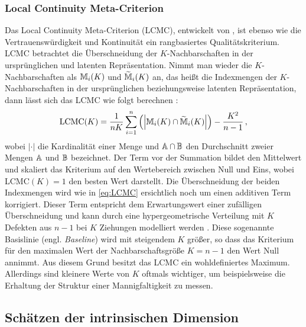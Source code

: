 \subsubsection{Local Continuity Meta-Criterion}
\label{ch:Vergleich:sec:Methodik:subsec:Qualitaetskriterien:LCMC}
Das Local Continuity Meta-Criterion (LCMC), entwickelt von \textcite{Chen.2009}, ist ebenso wie die Vertrauenswürdigkeit und Kontinuität ein rangbasiertes Qualitätskriterium. LCMC betrachtet die Überschneidung der $K$-Nachbarschaften in der ursprünglichen und latenten Repräsentation. Nimmt man wieder die $K$-Nachbarschaften als $\mathbb{M}_i(K)$ und $\widetilde{\mathbb{M}}_i(K)$ an, das heißt die Indexmengen der $K$-Nachbarschaften in der ursprünglichen beziehungsweise latenten Repräsentation, dann lässt sich das LCMC wie folgt berechnen \parencite[212]{Chen.2009}:
\begin{equation}
	\label{eq:LCMC}
	\text{LCMC}(K) = \frac{1}{nK} \sum_{i=1}^{n} \left( \left| \mathbb{M}_i(K) \cap \widetilde{\mathbb{M}}_i(K) \right| \right) - \frac{K^2}{n - 1} \,,
\end{equation}
wobei $­|\cdot|$ die Kardinalität einer Menge und $\mathbb{A} \cap \mathbb{B}$ den Durchschnitt zweier Mengen $\mathbb{A}$ und $\mathbb{B}$ bezeichnet. Der Term vor der Summation bildet den Mittelwert und skaliert das Kriterium auf den Wertebereich zwischen Null und Eins, wobei LCMC$(K) = 1$ den besten Wert darstellt. Die Überschneidung der beiden Indexmengen wird wie in \eqref{eq:LCMC} ersichtlich noch um einen additiven Term korrigiert. Dieser Term entspricht dem Erwartungswert einer zufälligen Überschneidung und kann durch eine hypergeometrische Verteilung mit $K$ Defekten aus $n - 1$ bei $K$ Ziehungen modelliert werden \parencite[213]{Chen.2009}. Diese sogenannte Basislinie (engl. \textit{Baseline}) wird mit steigendem
$K$ größer, so dass das Kriterium für den maximalen Wert der Nachbarschaftsgröße $K = n - 1$ den
Wert Null annimmt. Aus diesem Grund besitzt das LCMC ein wohldefiniertes Maximum. Allerdings sind
kleinere Werte von $K$ oftmals wichtiger, um beispielsweise die Erhaltung der Struktur einer
Mannigfaltigkeit zu messen.

\subsection{Schätzen der intrinsischen Dimension}
\label{ch:Vergleich:sec:Methodik:subsec:SchaetzenDerIntrinsischenDim}

